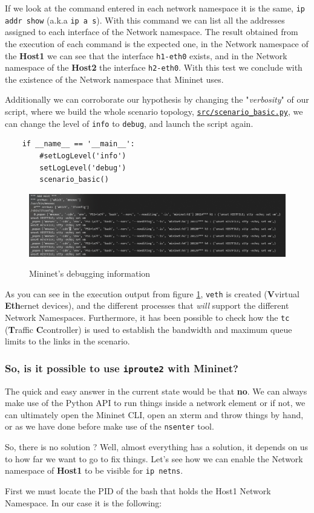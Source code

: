 \documentclass[12pt]{article}
\newcommand{\newpar} {
    \vskip 1cm
}
\begin{document}
			If we look at the command entered in each network namespace it is the same, \texttt{ip addr show} (a.k.a \texttt{ip a s}). With this command we can list all the addresses assigned to each interface of the Network namespace. The result obtained from the execution of each command is the expected one, in the Network namespace of the \textbf{Host1} we can see that the interface \texttt{h1-eth0} exists, and in the Network namespace of the \textbf{Host2} the interface \texttt{h2-eth0}. With this test we conclude with the existence of the Network namespace that Mininet uses.
			\newpar
			Additionally we can corroborate our hypothesis by changing the "\textit{verbosity}" of our script,  where we build the whole scenario topology, \newline \href{https://github.com/GAR-Project/project/blob/master/src/scenario_basic.py}{\texttt{src/scenario\_basic.py}}, we can change the level of \texttt{info} to \texttt{debug}, and launch the script again.

			\begin{verbatim}
	if __name__ == '__main__':
		#setLogLevel('info')
		setLogLevel('debug')
		scenario_basic()
			\end{verbatim}

			\begin{figure}
				\centering
				\includegraphics[width=\linewidth]{debug.png}
				\label{f:debug}
				\caption{Mininet's debugging information}
			\end{figure}

			As you can see in the execution output from figure \ref{f:debug}, \texttt{veth} is created (\textbf{V}virtual \textbf{Eth}ernet devices), and the different processes that \textit{will} support the different Network Namespaces. Furthermore, it has been possible to check how the \texttt{tc} (\textbf{T}raffic \textbf{C}controller) is used to establish the bandwidth and maximum queue limits to the links in the scenario.

		\subsubsection{So, is it possible to use \texttt{iproute2} with Mininet?}
			The quick and easy answer in the current state would be that \textbf{no}. We can always make use of the Python API to run things inside a network element or if not, we can ultimately open the Mininet CLI, open an xterm and throw things by hand, or as we have done before make use of the \texttt{nsenter} tool. 
			\newpar
			So, there is no solution ? Well, almost everything has a solution, it depends on us to how far we want to go to fix things. Let's see how we can enable the Network namespace of \textbf{Host1} to be visible for \texttt{ip netns}.
			\newpar
			First we must locate the PID of the bash that holds the Host1 Network Namespace. In our case it is the following:
\end{document}
